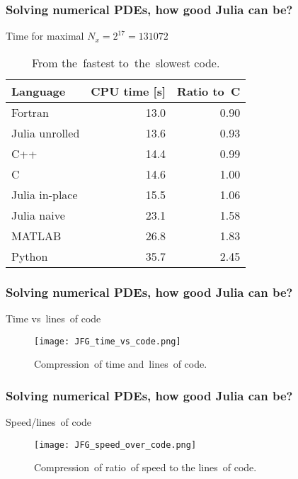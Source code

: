 \documentclass{beamer}  %
\begin{document}
\begin{frame}
  \frametitle{Solving numerical PDEs, how good Julia can be?}

  \begin{block}{Time for maximal $N_{ x } = 2^{ 17 } = 131072$}
    \begin{table}
      \centering
      
      \begin{tabular}{|l|r|r|}
        \hline
        Language & CPU time [s] & Ratio to~C \\
        \hline
        Fortran & 13.0 & 0.90 \\
        \hline
        Julia unrolled & 13.6 & 0.93 \\
        \hline
        C++ & 14.4 & 0.99 \\
        \hline
        C & 14.6 & 1.00 \\
        \hline
        Julia in-place & 15.5 & 1.06 \\
        \hline
        Julia naive & 23.1 & 1.58 \\
        \hline
        MATLAB & 26.8 & 1.83 \\
        \hline
        Python & 35.7 & 2.45 \\
        \hline
      \end{tabular}
      \caption{From the~fastest to~the~slowest code.}
    \end{table}
  \end{block}

\end{frame}





\begin{frame}
  \frametitle{Solving numerical PDEs, how good Julia can be?}

  \begin{block}{Time vs~lines~of code}
    \begin{figure}
      \centering

      \texttt{[image: JFG\_time\_vs\_code.png]}
      \caption{Compression~of time and~lines~of code.}
    \end{figure}
  \end{block}

\end{frame}





\begin{frame}
  \frametitle{Solving numerical PDEs, how good Julia can be?}

  \begin{block}{Speed/lines~of code}
    \begin{figure}
      \centering

      \texttt{[image: JFG\_speed\_over\_code.png]}
      \caption{Compression~of ratio~of speed to the lines~of code.}
    \end{figure}
  \end{block}

\end{frame}
\end{document}
